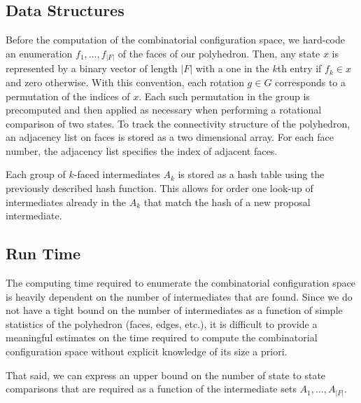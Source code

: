 
\subsection{Data Structures}

Before the computation of the combinatorial configuration space, we hard-code an enumeration $f_1, \dots, f_{|F|}$ of the faces of our polyhedron. Then, any state $x$ is represented by a binary vector of length $|F|$ with a one in the $k$th entry if $f_k \in x$ and zero otherwise. With this convention, each rotation $g \in G$ corresponds to a permutation of the indices of $x$. Each such permutation in the group is precomputed and then applied as necessary when performing a rotational comparison of two states. To track the connectivity structure of the polyhedron, an adjacency list on faces is stored as a two dimensional array. For each face number, the adjacency list specifies the index of adjacent faces.

Each group of $k$-faced intermediates $A_k$ is stored as a hash table using the previously described hash function. This allows for order one look-up of intermediates already in the $A_k$ that match the hash of a new proposal intermediate. 

\subsection{Run Time}

The computing time required to enumerate the combinatorial configuration space is heavily dependent on the number of intermediates that are found. Since we do not have a tight bound on the number of intermediates as a function of simple statistics of the polyhedron (faces, edges, etc.), it is difficult to provide a meaningful estimates on the time required to compute the combinatorial configuration space without explicit knowledge of its size a priori.

That said, we can express an upper bound on the number of state to state comparisons that are required as a function of the intermediate sets $A_1,\dots,A_{|F|}$. 

